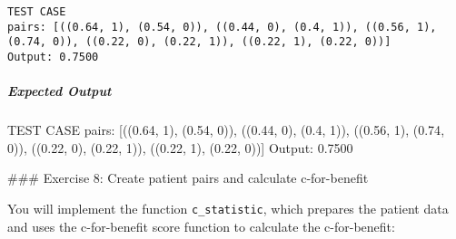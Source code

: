 \documentclass[11pt]{article}
\newenvironment{Shaded}{}{}
\newcommand{\DecValTok}[1]{\textcolor[rgb]{0.25,0.63,0.44}{{#1}}}
\newcommand{\FloatTok}[1]{\textcolor[rgb]{0.25,0.63,0.44}{{#1}}}
\newcommand{\NormalTok}[1]{{#1}}
\begin{document}
    \begin{Verbatim}[commandchars=\\\{\}]
TEST CASE
pairs: [((0.64, 1), (0.54, 0)), ((0.44, 0), (0.4, 1)), ((0.56, 1), (0.74, 0)), ((0.22, 0), (0.22, 1)), ((0.22, 1), (0.22, 0))]
Output: 0.7500

    \end{Verbatim}

    \hypertarget{expected-output}{%
\subparagraph{Expected Output}\label{expected-output}}

\begin{Shaded}
\begin{Highlighting}[]
\NormalTok{TEST CASE}
\NormalTok{pairs: [((}\FloatTok{0.64}\NormalTok{, }\DecValTok{1}\NormalTok{), (}\FloatTok{0.54}\NormalTok{, }\DecValTok{0}\NormalTok{)), ((}\FloatTok{0.44}\NormalTok{, }\DecValTok{0}\NormalTok{), (}\FloatTok{0.4}\NormalTok{, }\DecValTok{1}\NormalTok{)), ((}\FloatTok{0.56}\NormalTok{, }\DecValTok{1}\NormalTok{), (}\FloatTok{0.74}\NormalTok{, }\DecValTok{0}\NormalTok{)), ((}\FloatTok{0.22}\NormalTok{, }\DecValTok{0}\NormalTok{), (}\FloatTok{0.22}\NormalTok{, }\DecValTok{1}\NormalTok{)), ((}\FloatTok{0.22}\NormalTok{, }\DecValTok{1}\NormalTok{), (}\FloatTok{0.22}\NormalTok{, }\DecValTok{0}\NormalTok{))]}
\NormalTok{Output: }\FloatTok{0.7500}
\end{Highlighting}
\end{Shaded}

     \#\#\# Exercise 8: Create patient pairs and calculate c-for-benefit

You will implement the function \texttt{c\_statistic}, which prepares
the patient data and uses the c-for-benefit score function to calculate
the c-for-benefit:
\end{document}
